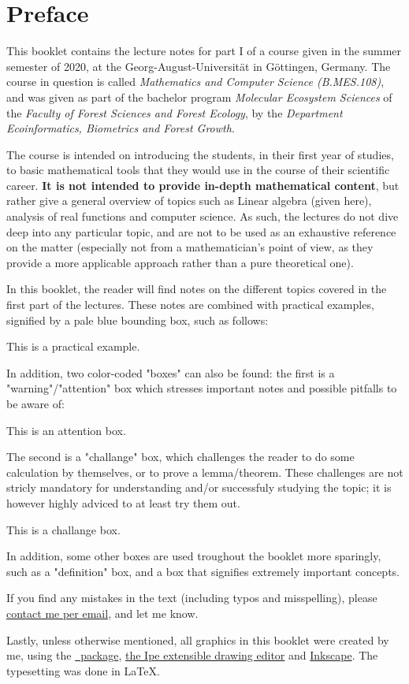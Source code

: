 \chapter*{Preface}
This booklet contains the lecture notes for part I of a course given in the summer semester of 2020, at the Georg-August-Universit\"at in G\"ottingen, Germany. The course in question is called \emph{Mathematics and Computer Science (B.MES.108)}, and was given as part of the bachelor program \emph{Molecular Ecosystem Sciences} of the \emph{Faculty of Forest Sciences and Forest Ecology}, by the \emph{Department Ecoinformatics, Biometrics and Forest Growth}.

The course is intended on introducing the students, in their first year of studies, to basic mathematical tools that they would use in the course of their scientific career. \textbf{It is not intended to provide in-depth mathematical content}, but rather give a general overview of topics such as Linear algebra (given here), analysis of real functions and computer science. As such, the lectures do not dive deep into any particular topic, and are not to be used as an exhaustive reference on the matter (especially not from a mathematician's point of view, as they provide a more applicable approach rather than a pure theoretical one).

In this booklet, the reader will find notes on the different topics covered in the first part of the lectures. These notes are combined with practical examples, signified by a pale blue bounding box, such as follows:
\begin{example}
  This is a practical example.
\end{example}

In addition, two color-coded "boxes" can also be found: the first is a "warning"/"attention" box which stresses important notes and possible pitfalls to be aware of:
\begin{warning}
  This is an attention box.
\end{warning}

The second is a "challange" box, which challenges the reader to do some calculation by themselves, or to prove a lemma/theorem. These challenges are not stricly mandatory for understanding and/or successfuly studying the topic; it is however highly adviced to at least try them out.

\begin{challange}
  This is a challange box.
\end{challange}

In addition, some other boxes are used troughout the booklet more sparingly, such as a "definition" box, and a box that signifies extremely important concepts.

If you find any mistakes in the text (including typos and misspelling), please \href{pelegs@gmail.com}{contact me per email}, and let me know.

Lastly, unless otherwise mentioned, all graphics in this booklet were created by me, using the \href{https://github.com/pgf-tikz/pgf}{\TikZ\ package}, \href{http://ipe.otfried.org}{the Ipe extensible drawing editor} and \href{https://inkscape.org}{Inkscape}. The typesetting was done in \LaTeX. 
